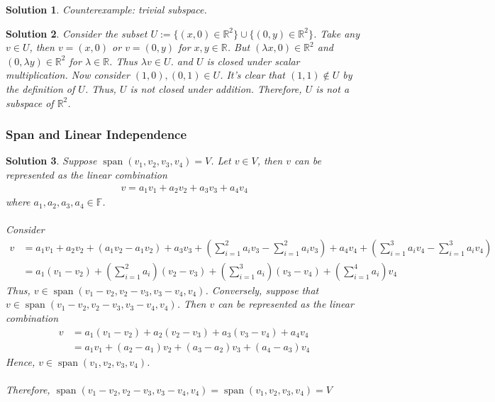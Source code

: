 \documentclass[12pt]{article}
\newcommand{\R}{\mathbb{R}}
\newcommand{\F}{\mathbb{F}}
\DeclareMathOperator{\spn}{span}
\theoremstyle{problem}
\newtheorem{sol}{Solution}
\theoremstyle{remark}
\begin{document}
\begin{sol}
Counterexample: trivial subspace. 
\end{sol}
\begin{sol}
    Consider the subset $U :=\{(x,0) \in \R^2\} \cup \{(0,y)\in\R^2 \}$. Take any $v \in U$, then $v = (x,0)$ or $v = (0,y)$ for $x,y \in \R$. But $(\lambda x,0) \in \R^2$ and $(0,\lambda y) \in \R^2$ for $\lambda \in \R$. Thus $\lambda v \in U$. and $U$ is closed under scalar multiplication. Now consider $(1,0), (0,1) \in U$. It's clear that $(1,1) \not \in U$ by the definition of $U$. Thus, $U$ is not closed under addition. Therefore, $U$ is not a subspace of $\R^2$.
\end{sol}

\subsubsection{Span and Linear Independence}
\begin{sol}
    Suppose $\spn(v_1,v_2,v_3,v_4) =V$. Let $v \in V$, then $v$ can be represented as the linear combination
    \begin{align*}
        v = a_1v_1 + a_2v_2 + a_3v_3 + a_4v_4
    \end{align*}
    where $a_1,a_2,a_3,a_4 \in \F$. \\ \\
    Consider
    \begin{align*}
        v &= a_1v_1 + a_2v_2 + (a_1v_2-a_1v_2) + a_3v_3 +\left(\sum_{i=1}^{2}a_iv_3 - \sum_{i=1}^{2}a_iv_3 \right) + a_4v_4 + \left(\sum_{i=1}^{3}a_iv_4 - \sum_{i=1}^{3}a_iv_4 \right) \\
        &=a_1(v_1 - v_2) +  \left(\sum_{i=1}^{2}a_i\right)(v_2-v_3) + \left(\sum_{i=1}^3a_i\right)(v_3-v_4) + \left(\sum_{i=1}^{4}a_i\right)v_4
    \end{align*}
    Thus, $v \in \spn(v_1-v_2,v_2-v_3,v_3-v_4,v_4)$. Conversely, suppose that $v \in \spn(v_1-v_2,v_2-v_3,v_3-v_4,v_4)$. Then $v$ can be represented as the linear combination
    \begin{align*}
        v &= a_1(v_1-v_2) + a_2(v_2-v_3) + a_3(v_3-v_4) + a_4v_4 \\
        &= a_1v_1 + (a_2-a_1)v_2 + (a_3-a_2)v_3 + (a_4-a_3)v_4
    \end{align*}
    Hence, $v \in \spn(v_1,v_2,v_3,v_4)$. \\ \\
    Therefore, $\spn(v_1-v_2,v_2-v_3,v_3-v_4,v_4) = \spn(v_1,v_2,v_3,v_4) = V$
\end{sol}
\end{document}
